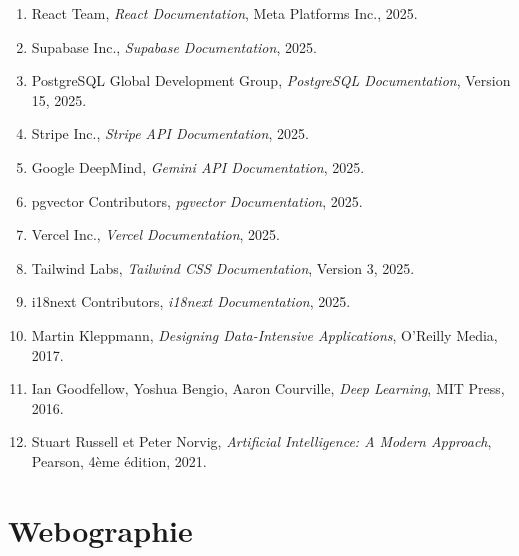 \documentclass[12pt, a4paper]{report}
\begin{document}
\begin{enumerate}

\item React Team, \textit{React Documentation}, Meta Platforms Inc., 2025.

\item Supabase Inc., \textit{Supabase Documentation}, 2025.

\item PostgreSQL Global Development Group, \textit{PostgreSQL Documentation}, Version 15, 2025.

\item Stripe Inc., \textit{Stripe API Documentation}, 2025.

\item Google DeepMind, \textit{Gemini API Documentation}, 2025.

\item pgvector Contributors, \textit{pgvector Documentation}, 2025.

\item Vercel Inc., \textit{Vercel Documentation}, 2025.

\item Tailwind Labs, \textit{Tailwind CSS Documentation}, Version 3, 2025.

\item i18next Contributors, \textit{i18next Documentation}, 2025.

\item Martin Kleppmann, \textit{Designing Data-Intensive Applications}, O'Reilly Media, 2017.

\item Ian Goodfellow, Yoshua Bengio, Aaron Courville, \textit{Deep Learning}, MIT Press, 2016.

\item Stuart Russell et Peter Norvig, \textit{Artificial Intelligence: A Modern Approach}, Pearson, 4ème édition, 2021.

\end{enumerate}

\chapter*{Webographie}
\end{document}
